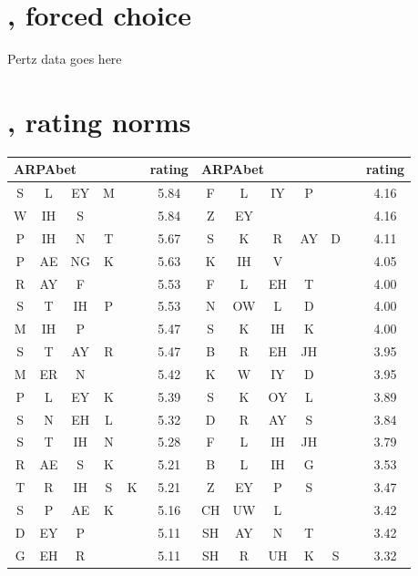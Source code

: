 \section{\citet{Pertz1975}, forced choice}

Pertz data goes here

\section{\citet{Albright2003b}, rating norms}

\begin{center}
\begin{longtable}{c@{ } c@{ } c@{ } c@{ } c@{ } c c c c c c c c}
\toprule
\multicolumn{5}{l}{ARPAbet} & rating & \multicolumn{6}{l}{ARPAbet} & rating \\ 
\midrule
S  & L  & EY & M  &   & 5.84  & F  & L  & IY & P  &    &   & 4.16 \\
W  & IH & S  &    &   & 5.84  & Z  & EY &    &    &    &   & 4.16 \\
P  & IH & N  & T  &   & 5.67  & S  & K  & R  & AY & D  &   & 4.11 \\
P  & AE & NG & K  &   & 5.63  & K  & IH & V  &    &    &   & 4.05 \\
R  & AY & F  &    &   & 5.53  & F  & L  & EH & T  &    &   & 4.00 \\
S  & T  & IH & P  &   & 5.53  & N  & OW & L  & D  &    &   & 4.00 \\
M  & IH & P  &    &   & 5.47  & S  & K  & IH & K  &    &   & 4.00 \\
S  & T  & AY & R  &   & 5.47  & B  & R  & EH & JH &    &   & 3.95 \\
M  & ER & N  &    &   & 5.42  & K  & W  & IY & D  &    &   & 3.95 \\
P  & L  & EY & K  &   & 5.39  & S  & K  & OY & L  &    &   & 3.89 \\
S  & N  & EH & L  &   & 5.32  & D  & R  & AY & S  &    &   & 3.84 \\
S  & T  & IH & N  &   & 5.28  & F  & L  & IH & JH &    &   & 3.79 \\
R  & AE & S  & K  &   & 5.21  & B  & L  & IH & G  &    &   & 3.53 \\
T  & R  & IH & S  & K & 5.21  & Z  & EY & P  & S  &    &   & 3.47 \\
S  & P  & AE & K  &   & 5.16  & CH & UW & L  &    &    &   & 3.42 \\ 
D  & EY & P  &    &   & 5.11  & SH & AY & N  & T  &    &   & 3.42 \\ 
G  & EH & R  &    &   & 5.11  & SH & R  & UH & K  & S  &   & 3.32 \\

\end{longtable}
\end{center}
